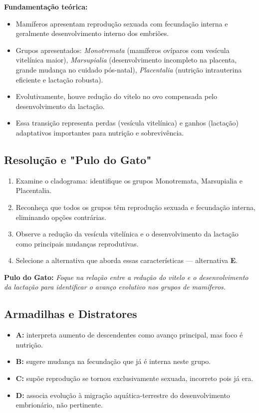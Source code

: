 \documentclass{article}
\begin{document}
\bigskip

\textbf{Fundamentação teórica:}
\begin{itemize}
  \item Mamíferos apresentam reprodução sexuada com fecundação interna e geralmente desenvolvimento interno dos embriões.
  \item Grupos apresentados: \emph{Monotremata} (mamíferos ovíparos com vesícula vitelínica maior), \emph{Marsupialia} (desenvolvimento incompleto na placenta, grande mudança no cuidado pós-natal), \emph{Placentalia} (nutrição intrauterina eficiente e lactação robusta).
  \item Evolutivamente, houve redução do vitelo no ovo compensada pelo desenvolvimento da lactação.
  \item Essa transição representa perdas (vesícula vitelínica) e ganhos (lactação) adaptativos importantes para nutrição e sobrevivência.
\end{itemize}

\subsection*{Resolução e "Pulo do Gato"}

\begin{enumerate}
  \item Examine o cladograma: identifique os grupos Monotremata, Marsupialia e Placentalia.
  \item Reconheça que todos os grupos têm reprodução sexuada e fecundação interna, eliminando opções contrárias.
  \item Observe a redução da vesícula vitelínica e o desenvolvimento da lactação como principais mudanças reprodutivas.
  \item Selecione a alternativa que aborda essas características — alternativa \textbf{E}.
\end{enumerate}

\bigskip

\textbf{Pulo do Gato:} \emph{Foque na relação entre a redução do vitelo e o desenvolvimento da lactação para identificar o avanço evolutivo nos grupos de mamíferos.}

\subsection*{Armadilhas e Distratores}

\begin{itemize}
  \item \textbf{A:} interpreta aumento de descendentes como avanço principal, mas foco é nutrição.
  \item \textbf{B:} sugere mudança na fecundação que já é interna neste grupo.
  \item \textbf{C:} supõe reprodução se tornou exclusivamente sexuada, incorreto pois já era.
  \item \textbf{D:} associa evolução à migração aquática-terrestre do desenvolvimento embrionário, não pertinente.
\end{itemize}
\end{document}
